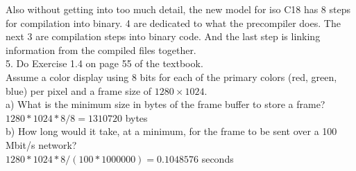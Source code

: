 Also without getting into too much detail, the new model for iso C18 has 8 steps for compilation into binary. 4 are dedicated to what the precompiler does. The next 3 are compilation steps into binary code. And the last step is linking information from the compiled files together. \\

5. Do Exercise 1.4 on page 55 of the textbook. \\

Assume a color display using 8 bits for each of the primary colors (red, green, blue) per pixel and a frame size of $1280 \times  1024$. \\

a) What is the minimum size in bytes of the frame buffer to store a frame? \\

$1280 * 1024 * 8/8 = 1310720$ bytes \\

b) How long would it take, at a minimum, for the frame to be sent over a 100 Mbit/s network? \\

$1280 * 1024 * 8 / (100 * 1000000) = 0.1048576$ seconds



